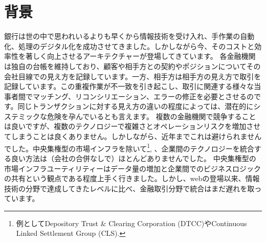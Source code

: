 \documentclass{article}
\begin{document}
\section{背景}
銀行は世の中で思われいるよりも早くから情報技術を受け入れ、手作業の自動化、処理のデジタル化を成功させてきました。しかしながら今、そのコストと効率性を著しく向上させるアーキテクチャーが登場してきています。
各金融機関は独自の台帳を維持しており、顧客や相手方との契約やポジションについてその会社目線での見え方を記録しています。一方、相手方は相手方の見え方で取引を記録しています。この重複作業が不一致を引き起こし、取引に関連する様々な当事者間でマッチング、リコンシリエーション、エラーの修正を必要とさせるのです。同じトランザクションに対する見え方の違いの程度によっては、潜在的にシステミックな危険を孕んでいるとも言えます。
複数の金融機関で競争することは良いですが、複数のテクノロジーで複雑さとオペレーションリスクを増加させてしまうことは良くありません。しかしながら、近年までこれは避けられませんでした。中央集権型の市場インフラを除いて\footnote{例としてDepository Trust \& Clearing Corporation (DTCC)やContinuous Linked Settlement Group (CLS).}, 、企業間のテクノロジーを統合する良い方法は（会社の合併なしで）ほとんどありませんでした。 
中央集権型の市場インフラユーティリティーはデータ量の増加と企業間でのビジネスロジックの共有という観点である程度上手く行きました。しかし、webの登場以来、情報技術の分野で達成してきたレベルに比べ、金融取引分野で統合はまだ遅れを取っています。\cite{IT}
\end{document}
